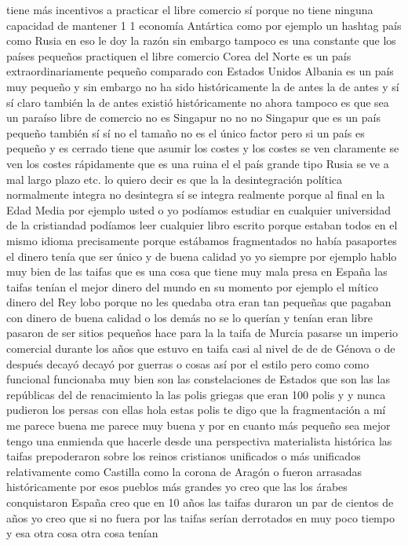 tiene más incentivos a practicar el libre comercio sí porque no tiene ninguna capacidad de mantener 1 1 economía Antártica
como por ejemplo un hashtag país como Rusia en eso le doy la razón sin embargo tampoco es una constante
que los países pequeños practiquen el libre comercio Corea del Norte es un país extraordinariamente pequeño comparado con Estados Unidos
Albania es un país muy pequeño y sin embargo no ha sido históricamente la de antes la de antes
y sí sí claro también la de antes existió históricamente no ahora tampoco es que sea un paraíso libre de comercio
no es Singapur no no no Singapur que es un país pequeño también sí sí no
el tamaño no es el único factor pero si un país es pequeño y es cerrado
tiene que asumir los costes y los costes se ven claramente se ven los costes rápidamente que es una ruina el el país grande tipo Rusia
se ve a mal largo plazo etc. lo quiero decir es que la la desintegración política normalmente
integra no desintegra sí se integra realmente porque al final
en la Edad Media por ejemplo usted o yo podíamos estudiar en cualquier universidad de la cristiandad podíamos leer cualquier libro escrito
porque estaban todos en el mismo idioma precisamente porque estábamos fragmentados no había pasaportes el dinero tenía que ser único y de buena calidad
yo yo siempre por ejemplo hablo muy bien de las taifas que es una cosa que tiene muy mala presa en España
las taifas tenían el mejor dinero del mundo en su momento por ejemplo el mítico dinero del Rey lobo
porque no les quedaba otra eran tan pequeñas que pagaban con dinero de buena calidad o los demás no se lo querían y tenían eran libre
pasaron de ser sitios pequeños hace para la la taifa de Murcia pasarse un imperio comercial
durante los años que estuvo en taifa casi al nivel de de de Génova o de después decayó decayó por guerras o cosas así por el estilo
pero como como funcional funcionaba muy bien son las constelaciones de Estados que son las las repúblicas del de renacimiento
la las polis griegas que eran 100 polis y y nunca pudieron los persas con ellas
hola estas polis te digo que la fragmentación a mí me parece buena me parece muy buena y por en cuanto más pequeño sea
mejor tengo una enmienda que hacerle desde una perspectiva materialista histórica las taifas
prepoderaron sobre los reinos cristianos unificados o más unificados relativamente como Castilla
como la corona de Aragón o fueron arrasadas históricamente por esos pueblos más grandes yo creo que las
los árabes conquistaron España creo que en 10 años las taifas duraron un par de cientos de años
yo creo que si no fuera por las taifas serían derrotados en muy poco tiempo y esa otra cosa otra cosa tenían
